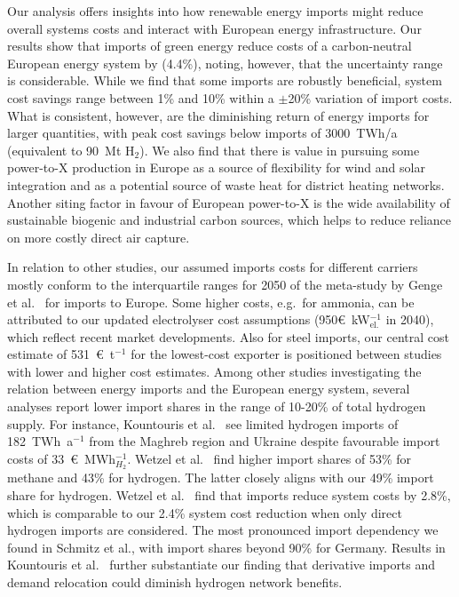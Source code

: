 Our analysis offers insights into how renewable energy imports might reduce
overall systems costs and interact with European energy infrastructure. Our
results show that imports of green energy reduce costs of a carbon-neutral
European energy system by  (4.4\%), noting, however, that the
uncertainty range is considerable. While we find that some imports are robustly
beneficial, system cost savings range between 1\% and 10\% within a $\pm$20\%
variation of import costs. What is consistent, however, are the diminishing
return of energy imports for larger quantities, with peak cost savings below
imports of 3000~TWh/a (equivalent to 90~Mt H$_2$). We also find that there is
value in pursuing some \mbox{power-to-X} production in Europe as a source of
flexibility for wind and solar integration and as a potential source of waste
heat for district heating networks. Another siting factor in favour of European
\mbox{power-to-X} is the  wide availability of sustainable biogenic and
industrial carbon sources, which helps to reduce reliance on more costly direct
air capture.

In relation to other studies, our assumed imports costs for different carriers
mostly conform to the interquartile ranges for 2050 of the meta-study by Genge
et al.~\cite{gengeSupplyCostsGreen2023} for imports to Europe. Some higher
costs, e.g.~for ammonia, can be attributed to our updated electrolyser cost
assumptions (950\euro{}~kW$_\text{el.}^{-1}$ in 2040), which reflect recent
market developments.\cite{ieaGlobalHydrogenReview2024} Also for steel imports,
our central cost estimate of 531~\euro{}~t$^{-1}$ for the lowest-cost exporter
is positioned between studies with lower\cite{lopezDefossilisedSteel2023} and
higher\cite{verpoortImpactGlobalHeterogeneity2024} cost estimates. Among other
studies investigating the relation between energy imports and the European
energy system, several analyses report lower import shares in the range of
10-20\% of total hydrogen
supply.\cite{seckHydrogenDecarbonization2022,frischmuthHydrogenSourcingStrategies2022,kountourisUnifiedEuropeanHydrogen2024}
For instance, Kountouris et al.~\cite{kountourisUnifiedEuropeanHydrogen2024} see
limited hydrogen imports of 182~TWh~a$^{-1}$ from the Maghreb region and Ukraine
despite favourable import costs of 33~\euro{}~MWh$_{H_2}^{-1}$. Wetzel et
al.~\cite{wetzelGreenEnergy2023a} find higher import shares of 53\% for methane
and 43\% for hydrogen. The latter closely aligns with our 49\% import share for
hydrogen. Wetzel et al.~\cite{wetzelGreenEnergy2023a} find that imports reduce
system costs by 2.8\%, which is comparable to our 2.4\% system cost reduction
when only direct hydrogen imports are considered. The most pronounced import
dependency we found in Schmitz et
al.\cite{schmitzImplicationsHydrogenImport2024a}, with import shares beyond 90\%
for Germany. Results in Kountouris et
al.~\cite{kountourisUnifiedEuropeanHydrogen2024} further substantiate our
finding that derivative imports and demand relocation could diminish hydrogen
network benefits.


